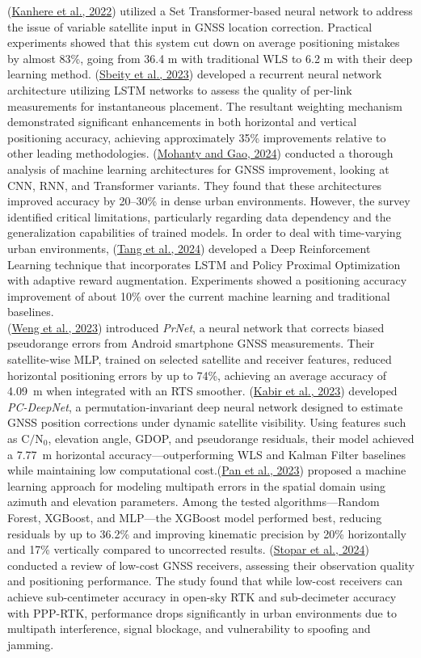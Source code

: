 \documentclass{isprs} %
\begin{document}
(\hyperref[kanhere2022]{Kanhere et al., 2022}) utilized a Set Transformer-based neural network to address the issue of variable satellite input in GNSS location correction. Practical experiments showed that this system cut down on average positioning mistakes by almost 83\%, going from 36.4 m with traditional WLS to 6.2 m with their deep learning method. (\hyperref[sbeity2023]{Sbeity et al., 2023}) developed a recurrent neural network architecture utilizing LSTM networks to assess the quality of per-link measurements for instantaneous placement.
The resultant weighting mechanism demonstrated significant enhancements in both horizontal and vertical positioning accuracy, achieving approximately 35\% improvements relative to other leading methodologies. (\hyperref[mohanty2024]{Mohanty and Gao, 2024}) conducted a thorough analysis of machine learning architectures for GNSS improvement, looking at CNN, RNN, and Transformer variants. They found that these architectures improved accuracy by 20–30\% in dense urban environments. However, the survey identified critical limitations, particularly regarding data dependency and the generalization capabilities of trained models. In order to deal with time-varying urban environments, (\hyperref[tang2024]{Tang et al., 2024}) developed a Deep Reinforcement Learning technique that incorporates LSTM and Policy Proximal Optimization with adaptive reward augmentation. Experiments showed a positioning accuracy improvement of about 10\% over the current machine learning and traditional baselines.\\
(\hyperref[weng2023]{Weng et al., 2023}) introduced \textit{PrNet}, a neural network that corrects biased pseudorange errors from Android smartphone GNSS measurements. Their satellite-wise MLP, trained on selected satellite and receiver features, reduced horizontal positioning errors by up to 74\%, achieving an average accuracy of 4.09~m when integrated with an RTS smoother. (\hyperref[kabir2023]{Kabir et al., 2023}) developed \textit{PC-DeepNet}, a permutation-invariant deep neural network designed to estimate GNSS position corrections under dynamic satellite visibility. Using features such as $\mathrm{C}/\mathrm{N}_0$, elevation angle, GDOP, and pseudorange residuals, their model achieved a 7.77~m horizontal accuracy—outperforming WLS and Kalman Filter baselines while maintaining low computational cost.(\hyperref[pan2023]{Pan et al., 2023}) proposed a machine learning approach for modeling multipath errors in the spatial domain using azimuth and elevation parameters. Among the tested algorithms—Random Forest, XGBoost, and MLP—the XGBoost model performed best, reducing residuals by up to 36.2\% and improving kinematic precision by 20\% horizontally and 17\% vertically compared to uncorrected results. (\hyperref[stopar2024]{Stopar et al., 2024}) conducted a review of low-cost GNSS receivers, assessing their observation quality and positioning performance. The study found that while low-cost receivers can achieve sub-centimeter accuracy in open-sky RTK and sub-decimeter accuracy with PPP-RTK, performance drops significantly in urban environments due to multipath interference, signal blockage, and vulnerability to spoofing and jamming.
\end{document}
